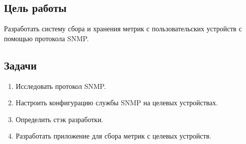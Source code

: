 \subsection*{Цель работы}

Разработать систему сбора и хранения метрик с пользовательских устройств с помощью протокола SNMP.

\subsection*{Задачи}

\begin{enumerate}
    \item Исследовать протокол SNMP.
    \item Настроить конфигурацию службы SNMP на целевых устройствах.
    \item Определить стэк разработки.
    \item Разработать приложение для сбора метрик с целевых устройств.
\end{enumerate}